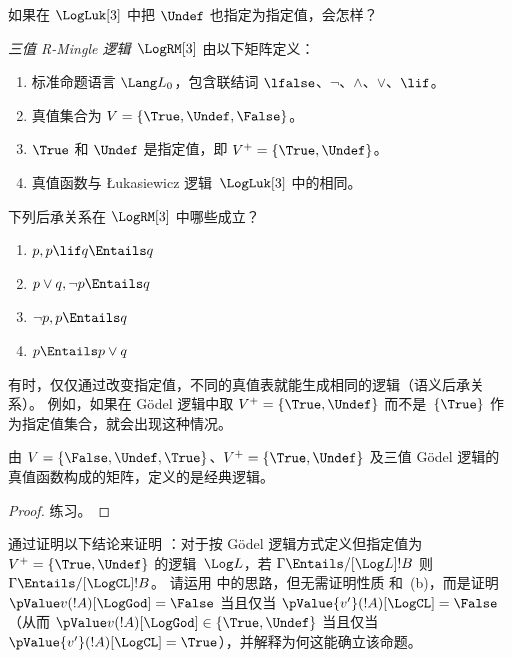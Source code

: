 \documentclass[../../../include/open-logic-section]{subfiles}
\begin{document}
如果在 $\LogLuk[3]$ 中把 $\Undef$ 也指定为指定值，会怎样？

\begin{defn}
  \emph{三值 R-Mingle 逻辑}~$\LogRM[3]$ 由以下矩阵定义：
  \begin{enumerate}
    \item 标准命题语言 $\Lang L_0$，包含联结词
    $\lfalse$、$\lnot$、$\land$、$\lor$、$\lif$。
    \item 真值集合为 $V = \{\True, \Undef, \False\}$。
    \item $\True$ 和 $\Undef$ 是指定值，即 $V^+ = \{\True, \Undef\}$。
    \item 真值函数与 Łukasiewicz 逻辑~$\LogLuk[3]$ 中的相同。
  \end{enumerate}
\end{defn}

\begin{prob}
  下列后承关系在 $\LogRM[3]$ 中哪些成立？
  \begin{enumerate}
    \item $p, p \lif q \Entails q$
    \item $p \lor q, \lnot p \Entails q$
    \item $\lnot p, p \Entails q$
    \item $p \Entails p \lor q$
  \end{enumerate}
\end{prob}

有时，仅仅通过改变指定值，不同的真值表就能生成相同的逻辑（语义后承关系）。
例如，如果在 Gödel 逻辑中取 $V^+ = \{\True,
\Undef\}$ 而不是~$\{\True\}$ 作为指定值集合，就会出现这种情况。

\begin{prop}
  由 $V = \{\False, \Undef,\True\}$、$V^+=\{\True,
  \Undef\}$ 及三值 Gödel 逻辑的真值函数构成的矩阵，定义的是经典逻辑。
\end{prop}

\begin{proof}
  练习。
\end{proof}

\begin{prob}
  通过证明以下结论来证明 ：对于按 Gödel 逻辑方式定义但指定值为 $V^+=\{\True,\Undef\}$ 的逻辑~$\Log L$，若 $\Gamma \Entails/[\Log L] !B$ 则 $\Gamma \Entails/[\LogCL] !B$。
  请运用  中的思路，但无需证明性质 和~(b)，而是证明 $\pValue v(!A)[\LogGod] = \False$ 当且仅当 $\pValue {v'}(!A)[\LogCL] = \False$（从而 $\pValue
  v(!A)[\LogGod] \in \{\True,\Undef\}$ 当且仅当 $\pValue {v'}(!A)[\LogCL] =
  \True$），并解释为何这能确立该命题。
\end{prob}
\end{document}
